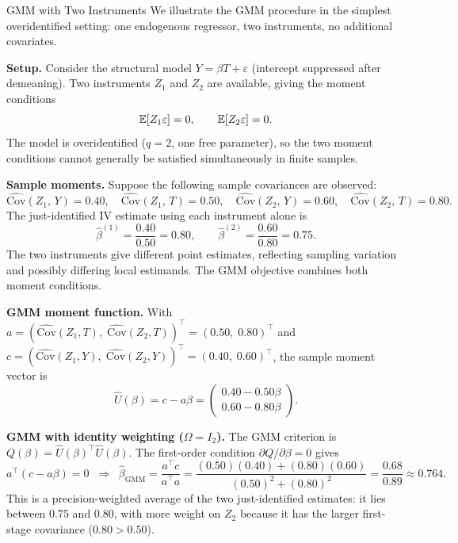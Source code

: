 \documentclass[master.tex]{subfiles}
\begin{document}
\begin{example}{GMM with Two Instruments}
\label{w12:ex:gmm-toy}
We illustrate the GMM procedure in the simplest overidentified
setting: one endogenous regressor, two instruments, no additional
covariates.

\textbf{Setup.}
Consider the structural model $Y = \beta T + \varepsilon$ (intercept
suppressed after demeaning).  Two instruments $Z_1$ and $Z_2$ are
available, giving the moment conditions
\[
  \mathbb{E}[Z_1\varepsilon] = 0,
  \qquad
  \mathbb{E}[Z_2\varepsilon] = 0.
\]
The model is overidentified ($q = 2$, one free parameter), so
the two moment conditions cannot generally be satisfied
simultaneously in finite samples.

\textbf{Sample moments.}
Suppose the following sample covariances are observed:
\[
  \widehat{\mathrm{Cov}}(Z_1,\,Y) = 0.40,
  \quad
  \widehat{\mathrm{Cov}}(Z_1,\,T) = 0.50,
  \quad
  \widehat{\mathrm{Cov}}(Z_2,\,Y) = 0.60,
  \quad
  \widehat{\mathrm{Cov}}(Z_2,\,T) = 0.80.
\]
The just-identified IV estimate using each instrument alone is
\[
  \hat\beta^{(1)} = \frac{0.40}{0.50} = 0.80,
  \qquad
  \hat\beta^{(2)} = \frac{0.60}{0.80} = 0.75.
\]
The two instruments give different point estimates, reflecting
sampling variation and possibly differing local estimands.  The
GMM objective combines both moment conditions.

\textbf{GMM moment function.}
With $a = (\widehat{\mathrm{Cov}}(Z_1,T),\;
\widehat{\mathrm{Cov}}(Z_2,T))^\top = (0.50,\;0.80)^\top$ and
$c = (\widehat{\mathrm{Cov}}(Z_1,Y),\;
\widehat{\mathrm{Cov}}(Z_2,Y))^\top = (0.40,\;0.60)^\top$,
the sample moment vector is
\[
  \hat{U}(\beta)
  = c - a\beta
  = \begin{pmatrix} 0.40 - 0.50\beta \\ 0.60 - 0.80\beta \end{pmatrix}.
\]

\textbf{GMM with identity weighting ($\Omega = I_2$).}
The GMM criterion is $Q(\beta) = \hat{U}(\beta)^\top \hat{U}(\beta)$.
The first-order condition $\partial Q/\partial\beta = 0$ gives
\[
  a^\top(c - a\beta) = 0
  \;\;\Longrightarrow\;\;
  \hat\beta_{\mathrm{GMM}}
  = \frac{a^\top c}{a^\top a}
  = \frac{(0.50)(0.40)+(0.80)(0.60)}{(0.50)^2+(0.80)^2}
  = \frac{0.68}{0.89}
  \approx 0.764.
\]
This is a precision-weighted average of the two just-identified
estimates: it lies between $0.75$ and $0.80$, with more weight on
$Z_2$ because it has the larger first-stage covariance ($0.80 >
0.50$).


\end{example}
\end{document}
